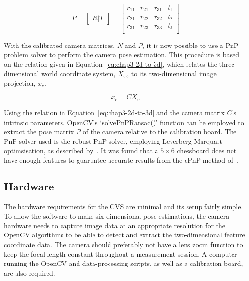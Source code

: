 \begin{equation}
  \label{eq:chap3-cam-extrinsic}
  P = 
  \begin{bmatrix}
    R | T
  \end{bmatrix}
  =
  \begin{bmatrix}
    r_{11} & r_{21} & r_{31} & t_1 \\
    r_{21} & r_{22} & r_{32} & t_2 \\
    r_{31} & r_{23} & r_{33} & t_3 \\
  \end{bmatrix}
\end{equation}

With the calibrated camera matrices, $N$ and $P$, it is now possible to use a PnP problem solver to perform the camera pose estimation. This procedure is based on the relation given in Equation~\ref{eq:chap3-2d-to-3d}, which relates the three-dimensional world coordinate system, $X_w$, to its two-dimensional image projection, $x_c$.  

\begin{equation}
   \label{eq:chap3-2d-to-3d}
   x_c
   = C
   X_w
\end{equation}

Using the relation in Equation~\ref{eq:chap3-2d-to-3d} and the camera matrix $C$'s intrinsic parameters, OpenCV's `solvePnPRansac()' function can be employed to extract the pose matrix $P$ of the camera relative to the calibration board. The PnP solver used is the robust PnP solver, employing Leverberg-Marquart optimsisation, as described by~\cite{schweighofer2006robust}. It was found that a $5\times6$ chessboard does not have enough features to guaruntee accurate results from the ePnP method of~\cite{lepetit2009epnp}.

\subsection{Hardware}

The hardware requirements for the CVS are minimal and its setup fairly simple. To allow the software to make six-dimensional pose estimations, the camera hardware needs to capture image data at an appropriate resolution for the OpenCV algorithms to be able to detect and extract the two-dimensional feature coordinate data. The camera should preferably not have a lens zoom function to keep the focal length constant throughout a measurement session. A computer running the OpenCV and data-processing scripts, as well as a calibration board, are also required. 

